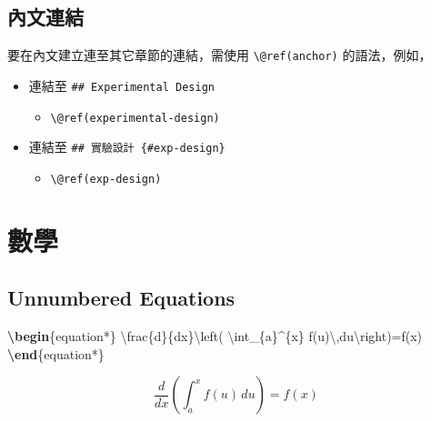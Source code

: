 \documentclass[oneside]{book}
\newenvironment{Shaded}{\begin{snugshade}}{\end{snugshade}}
\newcommand{\ExtensionTok}[1]{#1}
\newcommand{\KeywordTok}[1]{\textcolor[rgb]{0.13,0.29,0.53}{\textbf{#1}}}
\newcommand{\NormalTok}[1]{#1}
\newcommand{\SpecialCharTok}[1]{\textcolor[rgb]{0.00,0.00,0.00}{#1}}
\newcommand{\SpecialStringTok}[1]{\textcolor[rgb]{0.31,0.60,0.02}{#1}}
\providecommand{\tightlist}{%
  \setlength{\itemsep}{0pt}\setlength{\parskip}{0pt}}
\theoremstyle{definition}
\theoremstyle{definition}
\theoremstyle{definition}
\theoremstyle{remark}
\begin{document}
\subsection{內文連結}

要在內文建立連至其它章節的連結，需使用 \texttt{\textbackslash{}@ref(anchor)} 的語法，例如，

\begin{itemize}
\tightlist
\item
  連結至 \texttt{\#\#\ Experimental\ Design}

  \begin{itemize}
  \tightlist
  \item
    \texttt{\textbackslash{}@ref(experimental-design)}
  \end{itemize}
\item
  連結至 \texttt{\#\#\ 實驗設計\ \{\#exp-design\}}

  \begin{itemize}
  \tightlist
  \item
    \texttt{\textbackslash{}@ref(exp-design)}
  \end{itemize}
\end{itemize}

\hypertarget{math}{%
\section{數學}\label{math}}

\hypertarget{unnumbered-equations}{%
\subsection{Unnumbered Equations}\label{unnumbered-equations}}

\begin{Shaded}
\begin{Highlighting}[]
\KeywordTok{\textbackslash{}begin}\NormalTok{\{}\ExtensionTok{equation*}\NormalTok{\}}\SpecialStringTok{ }
\SpecialCharTok{\textbackslash{}frac}\SpecialStringTok{\{d\}\{dx\}}\SpecialCharTok{\textbackslash{}left}\SpecialStringTok{( }\SpecialCharTok{\textbackslash{}int}\SpecialStringTok{_\{a\}^\{x\} f(u)}\SpecialCharTok{\textbackslash{},}\SpecialStringTok{du}\SpecialCharTok{\textbackslash{}right}\SpecialStringTok{)=f(x)}
\KeywordTok{\textbackslash{}end}\NormalTok{\{}\ExtensionTok{equation*}\NormalTok{\} }
\end{Highlighting}
\end{Shaded}

\begin{equation*} 
\frac{d}{dx}\left( \int_{a}^{x} f(u)\,du\right)=f(x)
\end{equation*}
\end{document}
